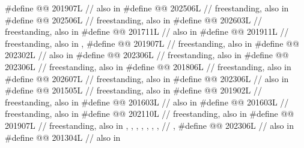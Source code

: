 \begin{codeblock}
#define @@     201907L // also in 
#define @@                    202506L // freestanding, also in 
#define @@                 202506L // freestanding, also in 
#define @@                        202603L // freestanding, also in 
#define @@                 201711L // also in 
#define @@       201911L // freestanding, also in , 
#define @@                       201907L // freestanding, also in 
#define @@                           202302L // also in 
#define @@                         202306L // freestanding, also in 
#define @@                        202306L // freestanding, also in 
#define @@                          201806L // freestanding, also in 
#define @@                            202607L // freestanding, also in 
#define @@                            202306L // also in 
#define @@                     201505L // freestanding, also in 
#define @@              201902L // freestanding, also in 
#define @@              201603L // also in 
#define @@                              201603L // freestanding, also in 
#define @@                          202110L // freestanding, also in 
#define @@                           201907L
  // freestanding, also in , , , , , , ,
  // , 
#define @@                            202306L // also in 
#define @@                       201304L // also in 

\end{codeblock}
